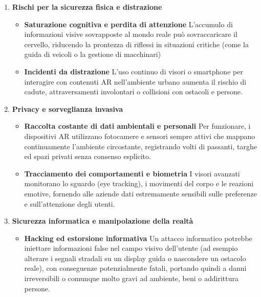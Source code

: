\begin{enumerate}
    \item \textbf{Rischi per la sicurezza fisica e distrazione} \newline
    \begin{itemize}
        \item \textbf{Saturazione cognitiva e perdita di attenzione} \newline
        L'accumulo di informazioni visive sovrapposte al mondo reale può sovraccaricare il cervello, riducendo la prontezza di riflessi in situazioni critiche (come la guida di veicoli o la gestione di macchinari)
        \item \textbf{Incidenti da distrazione} \newline
        L'uso continuo di visori o smartphone per interagire con contenuti AR nell'ambiente urbano aumenta il rischio di cadute, attraversamenti involontari o collisioni con ostacoli e persone.
    \end{itemize}

     \item \textbf{Privacy e sorveglianza invasiva} \newline
    \begin{itemize}
        \item \textbf{Raccolta costante di dati ambientali e personali} \newline
        Per funzionare, i dispositivi AR utilizzano fotocamere e sensori sempre attivi che mappano continuamente l'ambiente circostante, registrando volti di passanti, targhe ed spazi privati senza consenso esplicito.
        \item \textbf{Tracciamento dei comportamenti e biometria} \newline
        I visori avanzati monitorano lo sguardo (eye tracking), i movimenti del corpo e le reazioni emotive, fornendo alle aziende dati estremamente sensibili sulle preferenze e sull'attenzione degli utenti.

    \end{itemize}

    \item \textbf{Sicurezza informatica e manipolazione della realtà} \newline
    \begin{itemize}
        \item \textbf{Hacking ed estorsione informativa} \newline
        Un attacco informatico potrebbe iniettare informazioni false nel campo visivo dell'utente (ad esempio alterare i segnali stradali su un display guida o nascondere un ostacolo reale), con conseguenze potenzialmente fatali, portando quindi a danni irreversibili o comunque molto gravi ad ambiente, beni o addirittura persone.


\end{itemize}
\end{enumerate}
